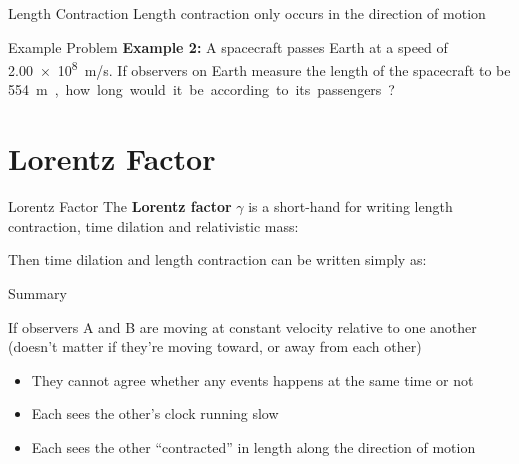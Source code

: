 \documentclass[12pt,compress,aspectratio=169]{beamer}
\newcommand{\bigsqrt}{\ensuremath\sqrt{1-\left(\frac{v}c\right)^2}}
\newcommand{\lorentz}{\ensuremath\frac1\bigsqrt}
\begin{document}
\begin{frame}{Length Contraction}
  Length contraction only occurs in the direction of motion
  \begin{center}
    \end{center}
\end{frame}



\begin{frame}{Example Problem}
  \textbf{Example 2:} A spacecraft passes Earth at a speed of \SI{2.00e8}{m/s}.
  If observers on Earth measure the length of the spacecraft to be
  \SI{554}\metre, how long would it be according to its passengers?
\end{frame}


\section{Lorentz Factor}

\begin{frame}{Lorentz Factor}
  The \textbf{Lorentz factor} $\gamma$ is a short-hand for writing length
  contraction, time dilation and relativistic mass:

  \eq{-.2in}{
    \boxed{\gamma=\lorentz}
  }
  
  Then time dilation and length contraction can be written simply as:
  
\end{frame}



\begin{frame}{Summary}
  \begin{center}
  \end{center}
  If observers A and B are moving at constant velocity relative to one another
  (doesn't matter if they're moving toward, or away from each other)
  \begin{itemize}
  \item They cannot agree whether any events happens at the same time or not
  \item Each sees the other's clock running slow
  \item Each sees the other ``contracted'' in length along the direction of
    motion
  \end{itemize}
\end{frame}
\end{document}
